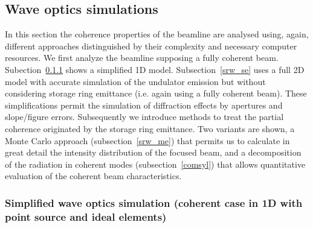 \documentclass{iucr}              %
\begin{document}
% 

\subsection{Wave optics simulations}
\label{level2}

In this section the coherence properties of the beamline are analysed using, again, different approaches  distinguished by their complexity and necessary computer resources. We first analyze the beamline supposing a fully coherent beam. Subection~\ref{wofry} shows a simplified 1D model. Subsection~\ref{srw_se} uses a full 2D model with accurate simulation of the undulator emission but without considering storage ring emittance (i.e. again using a fully coherent beam). These simplifications permit the simulation of diffraction effects by apertures and slope/figure errors. Subsequently we introduce methods to treat the partial coherence originated by the storage ring emittance. Two variants are shown, a Monte Carlo approach (subsection~\ref{srw_me}) that permits us to calculate in great detail the intensity distribution of the focused beam, and a decomposition of the radiation in coherent modes (subsection~\ref{comsyl}) that allows   quantitative evaluation of the coherent beam characteristics.  


\subsubsection{Simplified wave optics simulation (coherent case in 1D with point source and ideal elements)}
\label{wofry}
\end{document}
